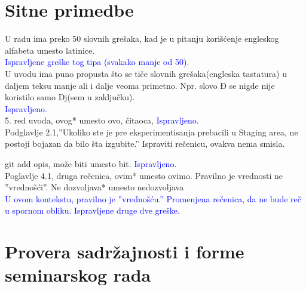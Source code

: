 \documentclass[a4paper]{report}
\newcommand{\odgovor}[1]{\textcolor{blue}{#1}}
\begin{document}
\section{Sitne primedbe}
U radu ima preko 50 slovnih grešaka, kad je u pitanju korišćenje engleskog alfabeta umesto latinice.\\
\odgovor{Ispravljene greške tog tipa (svakako manje od 50).}\\
U uvodu ima puno propusta što se tiče slovnih grešaka(engleska tastatura) u daljem teksu manje ali i dalje veoma primetno. Npr. slovo Đ se nigde nije koristilo samo Dj(sem u zaključku).\\
\odgovor{Ispravljeno.}\\
5. red uvoda, ovog* umesto ovo, čitaoca,\newline
\odgovor{Ispravljeno.}\\
Podglavlje 2.1,''Ukoliko ste je pre eksperimentisanja prebacili u Staging area, ne postoji bojazan da bilo šta izgubite.'' Ispraviti rečenicu, ovakva nema smisla.\newline


git add opis, može biti umesto bit.\newline
\odgovor{Ispravljeno.}\\
Poglavlje 4.1, druga rečenica, ovim* umesto ovimo. Pravilno je vrednosti ne ''vrednošći''. Ne dozvoljava* umesto nedozvoljava\\
\odgovor{U ovom kontekstu, pravilno je ''vrednošću.'' Promenjena rečenica, da ne bude reč u spornom obliku. Ispravljene druge dve greške.}\\



\section{Provera sadržajnosti i forme seminarskog rada}
\end{document}
